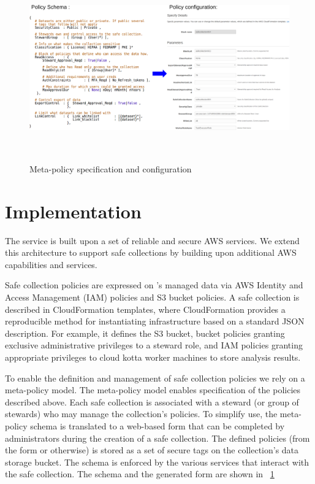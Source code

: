 \begin{figure}%
  \center
  \includegraphics[width=\textwidth, height=8cm]{figures/meta-policy.png}
  \caption{Meta-policy specification and configuration}
  \vspace{-1.5em}
  \label{fig:schema}
\end{figure}

\section{Implementation}

The \NAME service is built upon a set of reliable and secure
AWS services. We extend this architecture to support safe collections
by building upon additional AWS capabilities and services.

Safe collection policies are expressed on \NAMENS's managed
data via AWS Identity and Access Management (IAM) policies
and S3 bucket policies.
A safe collection is described in CloudFormation templates, where
CloudFormation provides a reproducible method for instantiating infrastructure
based on a standard JSON description. For example, it defines
the S3 bucket, bucket policies granting exclusive administrative privileges to a steward role,
and IAM policies granting appropriate privileges to cloud kotta worker machines to store analysis results.

To enable the definition and management of safe collection policies we
rely on a meta-policy model. The meta-policy model enables specification
of the policies described above. Each safe collection is associated with a steward
(or group of stewards) who may manage the collection's policies. To simplify use, the meta-policy schema
is translated to a web-based form that can be completed by administrators during the creation of a safe collection.
The defined policies (from the form or otherwise) is stored as a set of secure tags
on the collection's data storage bucket. The schema is enforced by the various services that interact
with the safe collection. The schema and the generated form are shown in \figurename~\ref{fig:schema}



